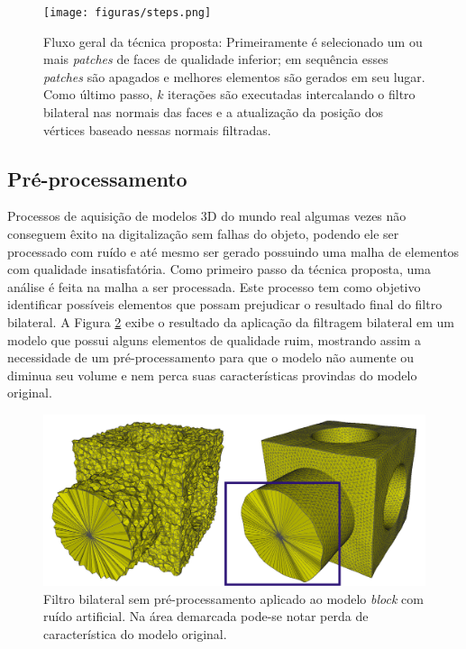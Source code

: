 \begin{figure}[!t]
\captionsetup{width=\linewidth}
\centering
\texttt{[image: figuras/steps.png]}
\caption{Fluxo geral da técnica proposta: Primeiramente é selecionado um ou mais \textit{patches} de faces de qualidade inferior; em sequência esses \textit{patches} são apagados e melhores elementos são gerados em seu lugar. Como último passo, $k$ iterações são executadas intercalando o filtro bilateral nas normais das faces e a atualização da posição dos vértices baseado nessas normais filtradas.}
\label{fig:steps}
\end{figure}

\subsection{Pré-processamento}

Processos de aquisição de modelos 3D do mundo real algumas vezes não conseguem êxito na digitalização sem falhas do objeto, podendo ele ser processado com ruído e até mesmo ser gerado possuindo uma malha de elementos com qualidade insatisfatória. Como primeiro passo da técnica proposta, uma análise é feita na malha a ser processada. Este processo tem como objetivo identificar possíveis elementos que possam prejudicar o resultado final do filtro bilateral. A Figura \ref{fig:comparisonwithoutpreprocessing} exibe o resultado da aplicação da filtragem bilateral em um modelo que possui alguns elementos de qualidade ruim, mostrando assim a necessidade de um pré-processamento para que o modelo não aumente ou diminua seu volume e nem perca suas características provindas do modelo original.


\begin{figure}[!h]
\captionsetup{width=\linewidth}
\centering
\includegraphics[width=\linewidth]{figuras/comparison.png}
\caption{Filtro bilateral sem pré-processamento aplicado ao modelo \textit{block} com ruído artificial. Na área demarcada pode-se notar perda de característica do modelo original.}
\label{fig:comparisonwithoutpreprocessing}
\end{figure}



